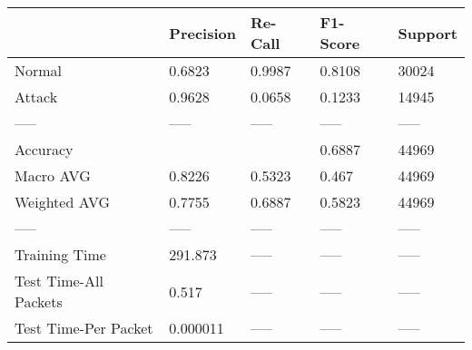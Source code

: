 \begin{tabular}{lllll}
\toprule
{} & Precision & Re-Call & F1-Score & Support \\
\midrule
Normal                &    0.6823 &  0.9987 &   0.8108 &   30024 \\
Attack                &    0.9628 &  0.0658 &   0.1233 &   14945 \\
-----                 &     ----- &   ----- &    ----- &   ----- \\
Accuracy              &           &         &   0.6887 &   44969 \\
Macro AVG             &    0.8226 &  0.5323 &    0.467 &   44969 \\
Weighted AVG          &    0.7755 &  0.6887 &   0.5823 &   44969 \\
-----                 &     ----- &   ----- &    ----- &   ----- \\
Training Time         &   291.873 &   ----- &    ----- &   ----- \\
Test Time-All Packets &     0.517 &   ----- &    ----- &   ----- \\
Test Time-Per Packet  &  0.000011 &   ----- &    ----- &   ----- \\
\bottomrule
\end{tabular}
